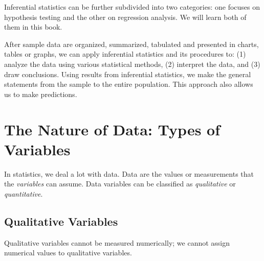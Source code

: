 Inferential statistics can be further subdivided into two categories: one focuses on hypothesis testing and the other on regression analysis. We will learn both of them in this book.  

\begin{example}  
After sample data are organized, summarized, tabulated and presented in charts, tables or graphs, we can apply inferential statistics and its procedures to: (1) analyze the data using various statistical methods, (2) interpret the data, and (3) draw conclusions. Using results from inferential statistics, we make the general statements from the sample to the entire population. This approach also allows us to make predictions. 
\end{example} 

      

   
\section{The Nature of Data: Types of Variables}

In statistics, we deal a lot with data. Data are the values or measurements that the {\it{variables}} can assume. Data variables can be classified as {\it{qualitative}} or {\it{quantitative}}.

\subsection{Qualitative Variables} 

Qualitative variables cannot be measured numerically; we cannot assign numerical values to qualitative variables. 

